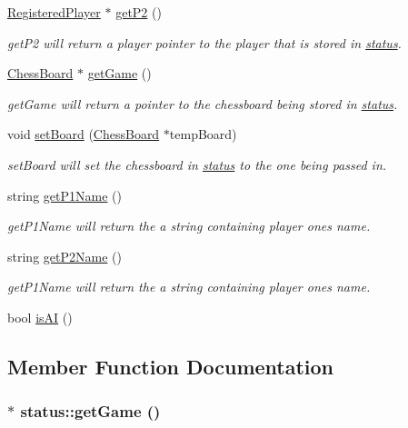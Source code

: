 \begin{DoxyCompactItemize}
\hyperlink{classRegisteredPlayer}{RegisteredPlayer} $\ast$ \hyperlink{classstatus_a944ffb3c3b34b2def529314610337fdb}{getP2} ()
\begin{DoxyCompactList}\small\item\em getP2 will return a player pointer to the player that is stored in \hyperlink{classstatus}{status}. \item\end{DoxyCompactList}\item 
\hyperlink{classChessBoard}{ChessBoard} $\ast$ \hyperlink{classstatus_a9c563bb6d7d1b93a19a46950e0eb0c12}{getGame} ()
\begin{DoxyCompactList}\small\item\em getGame will return a pointer to the chessboard being stored in \hyperlink{classstatus}{status}. \item\end{DoxyCompactList}\item 
void \hyperlink{classstatus_a19b60728812778c97551d46403fc24bb}{setBoard} (\hyperlink{classChessBoard}{ChessBoard} $\ast$tempBoard)
\begin{DoxyCompactList}\small\item\em setBoard will set the chessboard in \hyperlink{classstatus}{status} to the one being passed in. \item\end{DoxyCompactList}\item 
string \hyperlink{classstatus_a21344f4838dff393b03f3bf6594746d7}{getP1Name} ()
\begin{DoxyCompactList}\small\item\em getP1Name will return the a string containing player ones name. \item\end{DoxyCompactList}\item 
string \hyperlink{classstatus_a4b4ad3dc4ac1444ebd6be59f6771ce0d}{getP2Name} ()
\begin{DoxyCompactList}\small\item\em getP1Name will return the a string containing player ones name. \item\end{DoxyCompactList}\item 
bool \hyperlink{classstatus_abbe7c4fa038e61cf8949432ece0defcb}{isAI} ()
\end{DoxyCompactItemize}


\subsection{Member Function Documentation}
\hypertarget{classstatus_a9c563bb6d7d1b93a19a46950e0eb0c12}{
\subsubsection[{getGame}]{ $\ast$ status::getGame ()}}
\label{classstatus_a9c563bb6d7d1b93a19a46950e0eb0c12}


